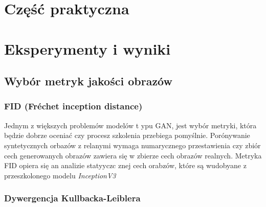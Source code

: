 \chapter{Część praktyczna}
    \justify
\chapter{Eksperymenty i wyniki}
	\justify
	\section{Wybór metryk jakości obrazów}
        \subsection{FID (Fréchet inception distance)}
            Jednym z większych problemów modelów t
            ypu GAN, jest wybór metryki, która będzie dobrze oceniać czy procesz szkolenia przebiega pomyślnie. Porónywanie syntetycznych orbazów z relanymi wymaga numarycznego przestawienia czy zbiór cech generowanych obrazów zawiera się w zbierze cech obrazów realnych. Metryka FID opiera się an analizie statyyczc znej cech orabzów, które są wudobyane z przeszkolonego modelu \textit{InceptionV3}
        \subsection{Dywergencja Kullbacka-Leiblera}
            
